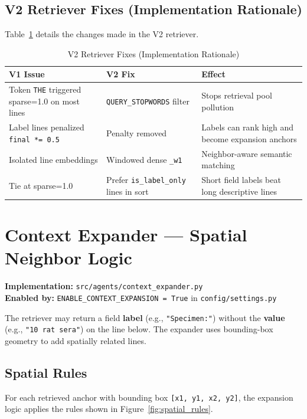 \documentclass[11pt,a4paper]{article}
\begin{document}
\subsection{V2 Retriever Fixes (Implementation Rationale)}
Table~\ref{tab:retriever_fixes} details the changes made in the V2 retriever.

\begin{table}[H]
\centering
\caption{V2 Retriever Fixes (Implementation Rationale)}
\label{tab:retriever_fixes}
\begin{tabular}{|p{5cm}|p{5cm}|p{5cm}|}
\hline
\textbf{V1 Issue} & \textbf{V2 Fix} & \textbf{Effect} \\ \hline
Token \texttt{THE} triggered sparse=1.0 on most lines & \texttt{QUERY\_STOPWORDS} filter & Stops retrieval pool pollution \\ \hline
Label lines penalized \texttt{final *= 0.5} & Penalty removed & Labels can rank high and become expansion anchors \\ \hline
Isolated line embeddings & Windowed dense \texttt{\_w1} & Neighbor-aware semantic matching \\ \hline
Tie at sparse=1.0 & Prefer \texttt{is\_label\_only} lines in sort & Short field labels beat long descriptive lines \\ \hline
\end{tabular}
\end{table}

\newpage
\section{Context Expander --- Spatial Neighbor Logic}
\textbf{Implementation:} \texttt{src/agents/context\_expander.py} \\
\textbf{Enabled by:} \texttt{ENABLE\_CONTEXT\_EXPANSION = True} in \texttt{config/settings.py}

The retriever may return a field \textbf{label} (e.g., \texttt{"Specimen:"}) without the \textbf{value} (e.g., \texttt{"10 rat sera"}) on the line below. The expander uses bounding-box geometry to add spatially related lines.

\subsection{Spatial Rules}
For each retrieved anchor with bounding box \texttt{[x1, y1, x2, y2]}, the expansion logic applies the rules shown in Figure~\ref{fig:spatial_rules}.
\end{document}
